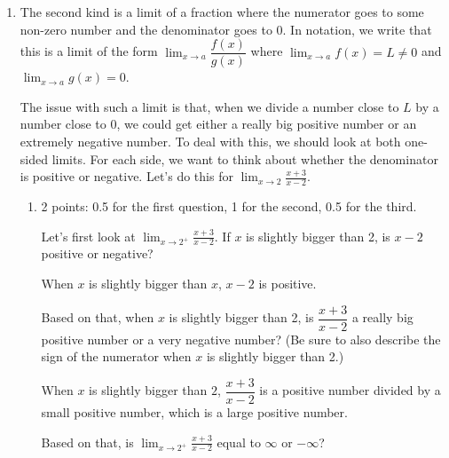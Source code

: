 \documentclass{article}
\begin{document}
\begin{enumerate}
\begin{enumerate}
  \item The second kind is a limit of a fraction where the numerator goes to some non-zero number and the denominator goes to 0. In notation, we write that this is a limit of the form $\displaystyle \lim_{x \to a} \dfrac{f(x)}{g(x)}$ where $\displaystyle \lim_{x \to a} f(x) = L \neq 0$ and $\displaystyle \lim_{x \to a} g(x) = 0$.

    The issue with such a limit is that, when we divide a number close to $L$ by a number close to 0, we could get either a really big positive number or an extremely negative number. To deal with this, we should look at both one-sided limits. For each side, we want to think about whether the denominator is positive or negative. Let's do this for $\displaystyle \lim_{x \to 2} \frac{x + 3}{x - 2}$.

    \begin{enumerate}
    \item

      \begin{grading}
        2 points: 0.5 for the first question, 1 for the second, 0.5 for the third. 
      \end{grading}

      \begin{problem}[0.25in]
        Let's first look at $\displaystyle \lim_{x \to 2^+} \frac{x + 3}{x - 2}$. If $x$ is slightly bigger than 2, is $x - 2$ positive or negative? 
      \end{problem}

      \begin{solution}
        When $x$ is slightly bigger than $x$, $x-2$ is positive.
      \end{solution}

      \begin{problem}[\stretch{2}]
        Based on that, when $x$ is slightly bigger than 2, is $\dfrac{x + 3}{x - 2}$ a really big positive number or a very negative number? (Be sure to also describe the sign of the numerator when $x$ is slightly bigger than 2.) 
      \end{problem}

      \begin{solution}
        When $x$ is slightly bigger than $2$, $\dfrac{x+3}{x-2}$ is a positive number divided by a small
        positive number, which is a large positive number.
      \end{solution}

      \begin{problem}[\newpage]
        Based on that, is $\displaystyle \lim_{x \to 2^+} \frac{x + 3}{x - 2}$ equal to $\infty$ or $-\infty$? 
      \end{problem}


\end{enumerate}
\end{enumerate}
\end{enumerate}
\end{document}
